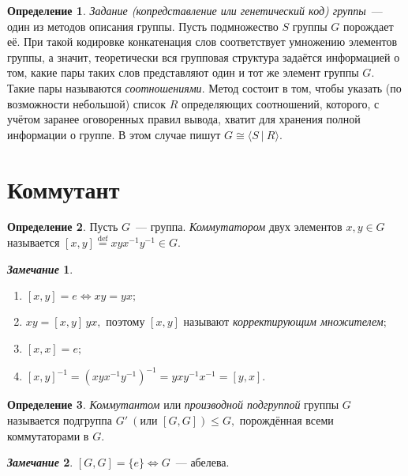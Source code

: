 \documentclass[a4paper, 14pt]{extarticle}
\newcommand{\deq}{\stackrel{\mathrm{def}}{=}}
\theoremstyle{definition}
\newtheorem*{remark}{\textit{Замечание}}
\newtheorem{definition}{Определение}
\theoremstyle{plain}
\numberwithin{theorem}{section}
\numberwithin{definition}{section}
\numberwithin{statement}{section}
\numberwithin{lemma}{section}
\numberwithin{consequence}{section}
\begin{document}
        \begin{definition}
            \textit{Задание (копредставление или генетический код) группы}~--- один из методов описания группы.
             Пусть подмножество $S$ группы $G$ порождает её. При такой кодировке конкатенация слов соответствует умножению элементов группы, а значит, теоретически вся групповая структура задаётся информацией о том, какие пары таких слов представляют один и тот же элемент группы $G$. Такие пары называются \textit{соотношениями}.  Метод состоит в том, чтобы указать (по возможности небольшой) список $R$ определяющих соотношений, которого, с учётом заранее оговоренных правил вывода, хватит для хранения полной информации о группе. В этом случае пишут ${G \cong \langle S \ | \ R \rangle.}$
        \end{definition}
        \newpage
        \section{Коммутант}
        \setcounter{definition}{0}
        \begin{definition}
            Пусть $G$~--- группа. \textit{Коммутатором} двух элементов ${x,y \in G}$ называется ${[x,y] \deq xyx^{-1}y^{-1} \in G.}$
        \end{definition}
        \begin{remark}
        \
            \begin{enumerate}
            \setlength\itemsep{0.1em}
                \item $[x,y] = e \Longleftrightarrow xy = yx;$
                \item ${xy = [x,y] \, yx,}$ поэтому $[x,y]$ называют \textit{корректирующим множителем};
                \item ${[x,x] = e;}$
                \item ${[x,y]^{-1} = (xyx^{-1}y^{-1})^{-1}=yxy^{-1}x^{-1}=[y,x].}$
            \end{enumerate}
        \end{remark}
        \begin{definition}
            \textit{Коммутантом} или \textit{производной подгруппой} группы $G$ называется подгруппа ${G' \ (\text{или }[G,G]) \leqslant G,}$ порождённая всеми коммутаторами в $G$.
        \end{definition}
        \begin{remark}
            ${[G,G] = \{e\} \Longleftrightarrow G}$~--- абелева.
        \end{remark}
\end{document}
